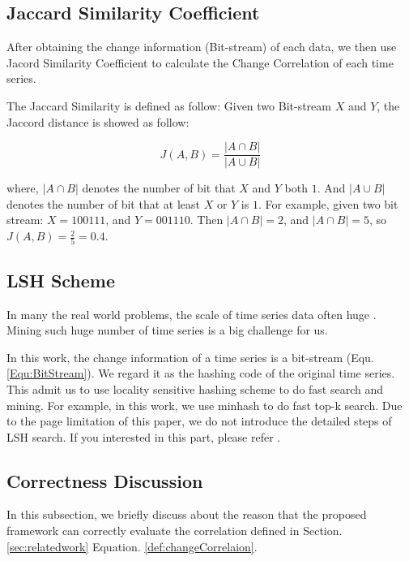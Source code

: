 \subsection{Jaccard Similarity Coefficient}

After obtaining the change information (Bit-stream) of each data, we then use Jacord Similarity Coefficient to calculate the Change Correlation of each time series.

The Jaccard Similarity \cite{han2011data} is defined as follow:
Given two Bit-stream $X$ and $Y$, the Jaccord distance is showed as follow:

\begin{equation}
J(A,B) = \frac{|A \cap B|}{|A \cup B|}
\end{equation}

where, $|A \cap B|$ denotes the number of bit that $X$ and $Y$ both $1$. And $|A \cup B|$ denotes the number of bit that at least $X$ or $Y$ is $1$.
For example, given two bit stream: $X={100111}$, and $Y={001110}$. Then $|A \cap B| = 2$, and $|A \cap B| = 5$, so $J(A,B) = \frac{2}{5} = 0.4$.

\subsection{LSH Scheme}

In many the real world problems, the scale of time series data often huge \cite{rakthanmanon2012searching}. Mining such huge number of time series is a big challenge for us.

In this work, the change information of a time series is a bit-stream (Equ. \ref{Equ:BitStream}). 
We regard it as the hashing code of the original time series. 
This admit us to use locality sensitive hashing scheme to do fast search and mining.
For example, in this work, we use minhash to do fast top-k search. Due to the page limitation of this paper, we do not introduce the detailed steps of LSH search. If you interested in this part, please refer \cite{shrivastava2014asymmetric,indyk1998approximate}.

\subsection{Correctness Discussion}

In this subsection, we briefly discuss about the reason that the proposed framework can correctly evaluate the correlation defined in Section.\ref{sec:relatedwork} Equation. \ref{def:changeCorrelaion}.

